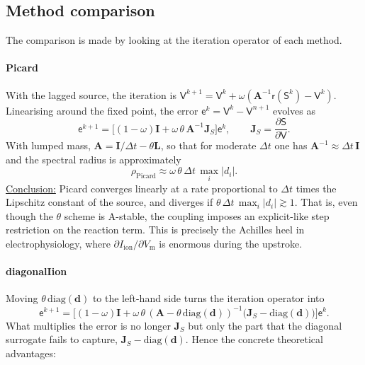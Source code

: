 \documentclass[11pt,a4paper]{article}
\newcommand{\Vm}{V_{\text{m}}}
\newcommand{\Iion}{I_{\mathrm{ion}}}
\newcommand{\Lop}{\mathbf{L}}
\newcommand{\Aimp}{\mathbf{A}}
\begin{document}
\subsection{Method comparison}
\label{sec:method-comparison}

The comparison is made by looking at the iteration operator of each method.

\paragraph{Picard} With the lagged source, the iteration is
$\mathsf{V}^{k+1}=\mathsf{V}^k+\omega(\Aimp^{-1}\mathsf{r}(\mathsf{S}^k)-\mathsf{V}^k)$.
Linearising around the fixed point, the error
$\mathsf{e}^k=\mathsf{V}^k-\mathsf{V}^{n+1}$ evolves as
$$
\mathsf{e}^{k+1}=\big[(1-\omega)\mathbf{I}+\omega\,\theta\,\Aimp^{-1}\mathbf{J}_S\big]\mathsf{e}^k,\qquad \mathbf{J}_S=\frac{\partial\mathsf{S}}{\partial\mathsf{V}}.
$$
With lumped mass, $\Aimp=\mathbf{I}/\Delta t-\theta\Lop$, so that for moderate
$\Delta t$ one has $\Aimp^{-1}\approx\Delta t\,\mathbf{I}$ and the spectral
radius is approximately
$$
\rho_{\text{Picard}}\approx\omega\,\theta\,\Delta t\,\max_i|d_i| .
$$
\underline{Conclusion:} Picard converges linearly
at a rate proportional to $\Delta t$ times the Lipschitz constant of the source,
and diverges if $\theta\,\Delta t\,\max_i|d_i|\gtrsim1$. That is, even though
the $\theta$ scheme is A-stable, the coupling imposes an explicit-like step
restriction on the reaction term. This is precisely the Achilles heel in
electrophysiology, where $\partial\Iion/\partial\Vm$ is enormous during the
upstroke.

\paragraph{diagonalIion} Moving $\theta\,\mathrm{diag}(\mathbf{d})$ to the left-hand side turns the
iteration operator into
$$
\mathsf{e}^{k+1}=\big[(1-\omega)\mathbf{I}+\omega\,\theta\,(\Aimp-\theta\,\mathrm{diag}(\mathbf{d}))^{-1}\big(\mathbf{J}_S-\mathrm{diag}(\mathbf{d})\big)\big]\mathsf{e}^k .
$$
What multiplies the error is no longer $\mathbf{J}_S$ but only the part that the
diagonal surrogate fails to capture, $\mathbf{J}_S-\mathrm{diag}(\mathbf{d})$.
Hence the concrete theoretical advantages:
\end{document}
